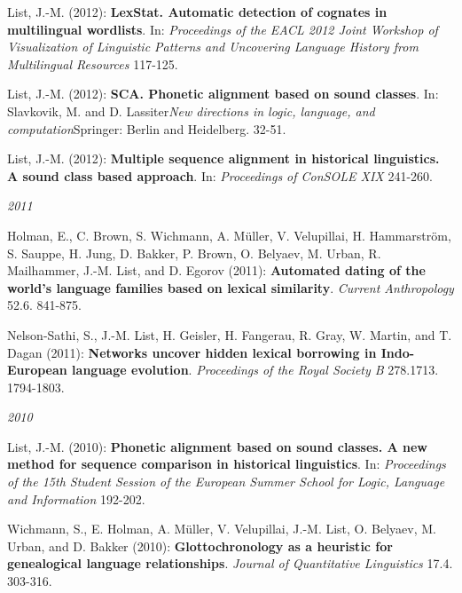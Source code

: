 \par
\nopagebreak\noindent List, J.-M. (2012): \textbf{LexStat. Automatic detection of cognates in multilingual wordlists}. In: \textit{Proceedings of the EACL 2012 Joint Workshop of Visualization of Linguistic Patterns and Uncovering Language History from Multilingual Resources} 117-125.\vspace{0.25cm}
\par
\nopagebreak\noindent List, J.-M. (2012): \textbf{SCA. Phonetic alignment based on sound classes}. In: Slavkovik, M. and D. Lassiter\textit{New directions in logic, language, and computation}Springer: Berlin and Heidelberg. 32-51.\vspace{0.25cm}
\par
\nopagebreak\noindent List, J.-M. (2012): \textbf{Multiple sequence alignment in historical linguistics}\textbf{. A sound class based approach}. In: \textit{Proceedings of ConSOLE XIX} 241-260.\vspace{0.25cm}
\par
\noindent\textit{2011}\par\nopagebreak\vspace{0.25cm}
\nopagebreak\noindent Holman, E., C. Brown, S. Wichmann, A. Müller, V. Velupillai, H. Hammarström, S. Sauppe, H. Jung, D. Bakker, P. Brown, O. Belyaev, M. Urban, R. Mailhammer, J.-M. List, and D. Egorov (2011): \textbf{Automated dating of the world's language families based on lexical similarity}. \textit{Current Anthropology} 52.6. 841-875.\vspace{0.25cm}
\par
\nopagebreak\noindent Nelson-Sathi, S., J.-M. List, H. Geisler, H. Fangerau, R. Gray, W. Martin, and T. Dagan (2011): \textbf{Networks uncover hidden lexical borrowing in Indo-European language evolution}. \textit{Proceedings of the Royal Society B} 278.1713. 1794-1803.\vspace{0.25cm}
\par
\noindent\textit{2010}\par\nopagebreak\vspace{0.25cm}
\nopagebreak\noindent List, J.-M. (2010): \textbf{Phonetic alignment based on sound classes}\textbf{. A new method for sequence comparison in historical linguistics}. In: \textit{Proceedings of the 15th Student Session of the European Summer School for Logic, Language and Information} 192-202.\vspace{0.25cm}
\par
\nopagebreak\noindent Wichmann, S., E. Holman, A. Müller, V. Velupillai, J.-M. List, O. Belyaev, M. Urban, and D. Bakker (2010): \textbf{Glottochronology as a heuristic for genealogical language relationships}. \textit{Journal of Quantitative Linguistics} 17.4. 303-316.\vspace{0.25cm}
